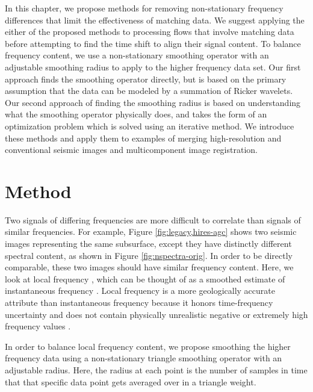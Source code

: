         In this chapter, we propose methods for removing non-stationary frequency differences that limit the effectiveness of matching data. 
        We suggest applying the either of the proposed methods to processing flows that involve matching data before attempting to find the time shift to align their signal content. 
        To balance frequency content, we use a non-stationary smoothing operator with an adjustable smoothing radius to apply to the higher frequency data set. 
        Our first approach finds the smoothing operator directly, but is based on the primary assumption that the data can be modeled by a summation of Ricker wavelets. 
        Our second approach of finding the smoothing radius is based on understanding what the smoothing operator physically does, and takes the form of an optimization problem which is solved using an iterative method. 
        We introduce these methods and apply them to examples of merging high-resolution and conventional seismic images and multicomponent image registration.

\section{Method}
        Two signals of differing frequencies are more difficult to correlate than signals of similar frequencies.  
        For example, Figure \ref{fig:legacy,hires-agc} shows two seismic images representing the same subsurface, except they have distinctly different spectral content, as shown in Figure \ref{fig:nspectra-orig}. 
        In order to be directly comparable, these two images should have similar frequency content.
        Here, we look at local frequency \cite[]{attr}, which can be thought of as a smoothed estimate of instantaneous frequency \cite[]{white}. 
        Local frequency is a more geologically accurate attribute than instantaneous frequency because it honors time-frequency uncertainty and does not contain physically unrealistic negative or extremely high frequency values \cite[]{attr}.

        In order to balance local frequency content, we propose smoothing the higher frequency data using a non-stationary triangle smoothing operator with an adjustable radius. 
        Here, the radius at each point is the number of samples in time that that specific data point gets averaged over in a triangle weight.

